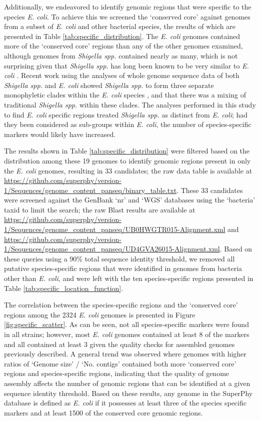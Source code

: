 \documentclass[doublespacing, linenumbers]{bmcart}
\begin{document}
Additionally, we endeavored to identify genomic regions that were specific to the species \textit{E. coli}. To achieve this we screened the `conserved core' against genomes from a subset of \textit{E. coli} and other bacterial species, the results of which are presented in Table \ref{tab:specific_distribution}. The \textit{E. coli} genomes contained more of the `conserved core' regions than any of the other genomes examined, although genomes from \textit{Shigella spp.} contained nearly as many, which is not surprising given that \textit{Shigella spp.} has long been known to be very similar to \textit{E. coli} \cite{pupo_multiple_2000}. Recent work using the analyses of whole genome sequence data of both \textit{Shigella spp.} and \textit{E. coli} showed \textit{Shigella spp.} to form three separate monophyletic clades within the \textit{E. coli} species \cite{sahl_defining_2015}, and that there was a mixing of traditional \textit{Shigella spp.} within these clades. The analyses performed in this study to find \textit{E. coli} specific regions treated \textit{Shigella spp.} as distinct from \textit{E. coli}; had they been considered as sub-groups within \textit{E. coli}, the number of species-specific markers would likely have increased.

 The results shown in Table \ref{tab:specific_distribution} were filtered based on the distribution among these 19 genomes to identify genomic regions present in only the \textit{E. coli} genomes, resulting in  33 candidates; the raw data table is available at \url{https://github.com/superphy/version-1/Sequences/genome_content_panseq/binary_table.txt}. These 33 candidates were screened against the GenBank `nr' and `WGS' databases using the `bacteria' taxid to limit the search; the raw Blast results are available at \url{https://github.com/superphy/version-1/Sequences/genome_content_panseq/UB0HWGTR015-Alignment.xml} and \url{https://github.com/superphy/version-1/Sequences/genome_content_panseq/UD4GVA26015-Alignment.xml}. Based on these queries using a 90\% total sequence identity threshold, we removed all putative species-specific regions that were identified in genomes from bacteria other than \textit{E. coli}, and were left with the ten species-specific regions presented in Table \ref{tab:specific_location_function}.

The correlation between the species-specific regions and the `conserved core' regions among the 2324 \textit{E. coli} genomes is presented in Figure \ref{fig:specific_scatter}. As can be seen, not all species-specific markers were found in all strains; however, most \textit{E. coli} genomes contained at least 8 of the markers and all contained at least 3 given the quality checks for assembled genomes previously described. A general trend was observed where genomes with higher ratios of `Genome size' / `No. contigs' contained both more `conserved core' regions and species-specific regions, indicating that the quality of genome assembly affects the number of genomic regions that can be identified at a given sequence identity threshold. Based on these results, any genome in the SuperPhy database is defined as \textit{E. coli} if it possesses at least three of the species specific markers and at least 1500 of the conserved core genomic regions.
\end{document}
